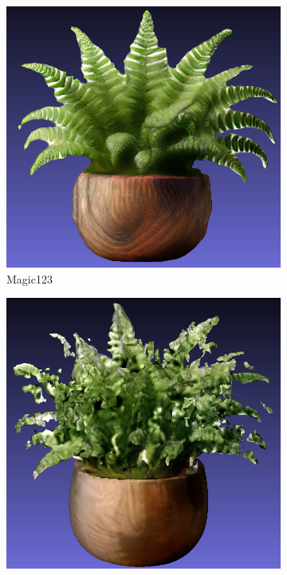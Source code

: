 \begin{figure}[ht]
    \begin{subfigure}[b]{0.28\textwidth}
        \centering
        \includegraphics[width=\textwidth]{figures/subjective/magic123_fern_front_result.png}
        \caption{Magic123}
        \vspace{0.1cm}
    \end{subfigure}
    \begin{subfigure}[b]{0.27\textwidth}
        \centering
        \includegraphics[width=\textwidth]{figures/subjective/wonder3d_fern_result.png}

\end{subfigure}
\end{figure}

